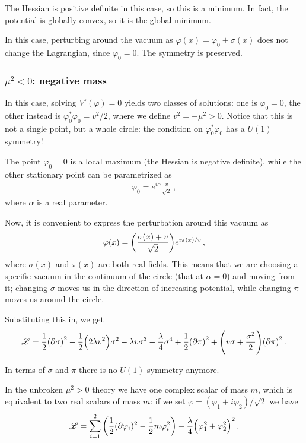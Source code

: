 \documentclass[main.tex]{subfiles}
\begin{document}
The Hessian is positive definite in this case, so this is a minimum. In fact, the potential is globally convex, so it is the global minimum.

In this case, perturbing around the vacuum as \(\varphi (x) = \varphi_0 + \sigma (x)\) does not change the Lagrangian, since \(\varphi_0 = 0\). The symmetry is preserved. 

\subsubsection{\(\mu^2 < 0\): negative mass}

In this case, solving \(V' (\varphi ) = 0\) yields two classes of solutions: one is \(\varphi_0 = 0\), the other instead is \(\varphi^{*}_{0} \varphi_0 = v^2 / 2\), where we define \(v^2 = - \mu^2 > 0 \). Notice that this is not a single point, but a whole circle: the condition on \(\varphi^{*}_{0} \varphi_0 \) has a \(U(1)\) symmetry!

The point \(\varphi_0 = 0\) is a local maximum (the Hessian is negative definite), while the other stationary point can be parametrized as 
%
\begin{align}
\varphi_0 = e^{i \alpha } \frac{v}{\sqrt{2}}
\,,
\end{align}
%
where \(\alpha \) is a real parameter. 

Now, it is convenient to express the perturbation around this vacuum as 
%
\begin{align}
\varphi (x) = \qty(\frac{\sigma (x) + v}{\sqrt{2}}) e^{i \pi (x) / v}
\,,
\end{align}
%
where \(\sigma (x)\) and \(\pi (x)\) are both real fields.
This means that we are choosing a specific vacuum in the continuum of the circle (that at \(\alpha = 0\)) and moving from it; changing \(\sigma \) moves us in the direction of increasing potential, while changing \(\pi \) moves us around the circle. 

Substituting this in, we get 
%
\begin{align}
\mathscr{L} = \frac{1}{2} \qty(\partial \sigma )^2 - \frac{1}{2} \qty(2 \lambda v^2) \sigma^2 - \lambda v \sigma^3 - \frac{\lambda}{4} \sigma^{4}
+ \frac{1}{2} \qty(\partial \pi )^2 + \qty(v \sigma + \frac{\sigma^2}{2}) \qty(\partial \pi )^2
\,.
\end{align}

In terms of \(\sigma \) and \(\pi \) there is no \(U(1)\) symmetry anymore. 

In the unbroken \(\mu^2 > 0\) theory we have one complex scalar of mass \(m\), which is equivalent to two real scalars of mass \(m\): if we set \(\varphi = (\varphi_1 + i \varphi_2 ) / \sqrt{2}\) we have 
%
\begin{align}
\mathscr{L} = \sum _{i=1}^{2}\qty( \frac{1}{2} (\partial \varphi_{i} )^2 - \frac{1}{2} m \varphi_{i}^2 ) - \frac{\lambda }{4} \qty(\varphi_1^2 + \varphi_2^2)^2 
\,.
\end{align}
\end{document}
